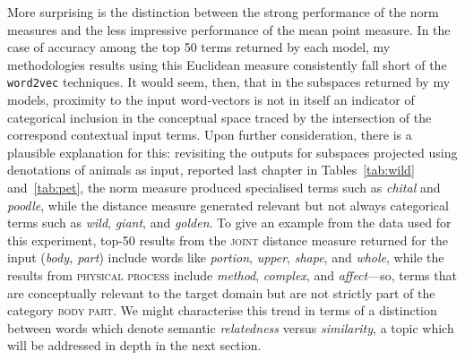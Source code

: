 More surprising is the distinction between the strong performance of the norm measures and the less impressive performance of the mean point measure.  In the case of accuracy among the top 50 terms returned by each model, my methodologies results using this Euclidean measure consistently fall short of the \texttt{word2vec} techniques.  It would seem, then, that in the subspaces returned by my models, proximity to the input word-vectors is not in itself an indicator of categorical inclusion in the conceptual space traced by the intersection of the correspond contextual input terms.  Upon further consideration, there is a plausible explanation for this: revisiting the outputs for subspaces projected using denotations of animals as input, reported last chapter in Tables~\ref{tab:wild} and~\ref{tab:pet}, the norm measure produced specialised terms such as \emph{chital} and \emph{poodle}, while the distance measure generated relevant but not always categorical terms such as \emph{wild}, \emph{giant}, and \emph{golden}.  To give an example from the data used for this experiment, top-50 results from the \textsc{joint} distance measure returned for the input (\emph{body, part}) include words like \emph{portion}, \emph{upper}, \emph{shape}, and \emph{whole}, while the results from \textsc{physical process} include \emph{method}, \emph{complex}, and \emph{affect}---so, terms that are conceptually relevant to the target domain but are not strictly part of the category \textsc{body part}.  We might characterise this trend in terms of a distinction between words which denote semantic \emph{relatedness} versus \emph{similarity}, a topic which will be addressed in depth in the next section.

